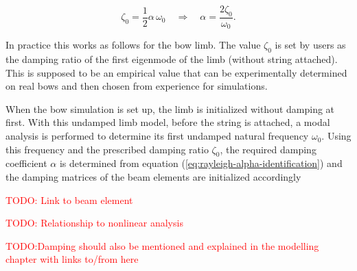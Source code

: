 \begin{equation}
\zeta_{0} = \frac{1}{2}\alpha\,\omega_{0} \quad \Rightarrow \quad \alpha = \frac{2\zeta_{0}}{\omega_{0}}. \label{eq:rayleigh-alpha-identification}
\end{equation}

In practice this works as follows for the bow limb.
The value $\zeta_{0}$ is set by users as the damping ratio of the first eigenmode of the limb (without string attached).
This is supposed to be an empirical value that can be experimentally determined on real bows and then chosen from experience for simulations.

When the bow simulation is set up, the limb is initialized without damping at first.
With this undamped limb model, before the string is attached, a modal analysis is performed to determine its first undamped natural frequency $\omega_{0}$.
Using this frequency and the prescribed damping ratio $\zeta_{0}$, the required damping coefficient $\alpha$ is determined from equation (\ref{eq:rayleigh-alpha-identification}) and the damping matrices of the beam elements are initialized accordingly

\textcolor{red}{TODO: Link to beam element}

\textcolor{red}{TODO: Relationship to nonlinear analysis}

\textcolor{red}{TODO:Damping should also be mentioned and explained in the modelling chapter with links to/from here}